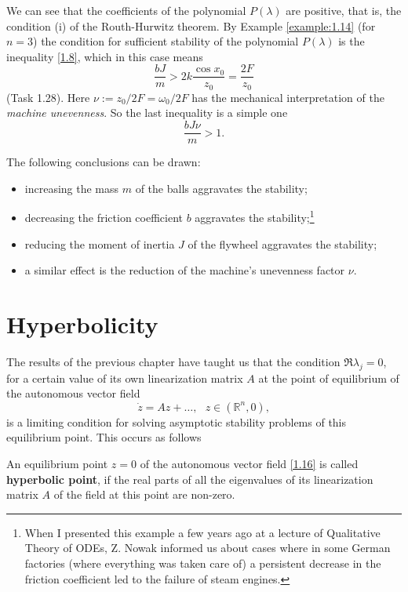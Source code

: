 \begin{example}
We can see that the coefficients of the polynomial $P(\lambda )$ are positive, that is, the condition (i) of the Routh-Hurwitz theorem. By Example \ref{example:1.14} (for $n = 3$) the condition for sufficient stability of the polynomial $P(\lambda )$ is the inequality \eqref{1.8}, which in this case means
\begin{equation}
\label{1.15}
\frac{bJ}{m}>2k\frac{\cos x_{0}}{z_{0}}=\frac{2F}{z_{0}}
\end{equation}
(Task 1.28). Here $\nu :=z_{0}/2F=\omega _{0}/2F$ has the mechanical interpretation of the \emph{machine unevenness}. So the last inequality is a simple one
$$
\frac{bJ\nu }{m}>1.
$$

The following conclusions can be drawn:
\begin{itemize}
	\item increasing the mass $m$ of the balls aggravates the stability;
	\item decreasing the friction coefficient $b$ aggravates the stability;\footnote{When I presented this example a few years ago at a lecture of Qualitative Theory of ODEs, Z. Nowak informed us about cases where in some German factories (where everything was taken care of) a persistent decrease in the friction coefficient led to the failure of steam engines.}
	\item reducing the moment of inertia $J$ of the flywheel aggravates the stability;
	\item a similar effect is the reduction of the machine's unevenness factor $\nu$.
\end{itemize}	
\end{example}

\section{Hyperbolicity}

The results of the previous chapter have taught us that the condition $\Re \lambda_j = 0$, for a certain value of its own linearization matrix $A$ at the point of equilibrium of the autonomous vector field
\begin{equation}
\label{1.16}
\dot{z}=Az+\ldots ,\text{ \ }z\in \left( \mathbb{R}^{n},0\right) ,
\end{equation}
is a limiting condition for solving asymptotic stability problems of this equilibrium point.
This occurs as follows

\begin{definition}
	An equilibrium point $z = 0$ of the autonomous vector field \eqref{1.16} is called \textbf{hyperbolic point}, if the real parts of all the eigenvalues of its linearization matrix $A$ of the field at this point are non-zero.
\end{definition}

